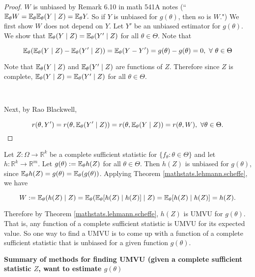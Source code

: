 \begin{proof} \(W\) is unbiased by Remark 6.10 in math 541A notes (``\(\E_\theta W = \E_\theta \E_\theta(Y \mid Z) = \E_\theta Y.\) So if \(Y\) is unbiased for \(g(\theta)\), then so is \(W\).") We first show \(W\) does not depend on \(Y\). Let \(Y'\) be an unbiased estimator for \(g(\theta)\). We show that \(\E_\theta(Y \mid Z) = \E_\theta(Y' \mid Z) \) for all \(\theta \in \Theta\). Note that

\[
\E_\theta( \E_\theta(Y \mid Z) - \E_\theta(Y' \mid Z)) = \E_\theta(Y - Y') = g(\theta) - g(\theta) = 0, \ \forall \ \theta \in \Theta
\]

Note that \( \E_\theta(Y \mid Z) \) and \(\E_\theta(Y' \mid Z)\) are functions of \(Z\). Therefore since \(Z\) is complete, \(\E_\theta(Y \mid Z)  = \E_\theta(Y' \mid Z)\) for all \(\theta \in \Theta\).

\

Next, by Rao Blackwell,

\[
r(\theta, Y') = r(\theta, \E_\theta(Y' \mid Z)) =  r(\theta, \E_\theta(Y \mid Z)) = r(\theta, W), \ \forall \theta \in \Theta.
\]

\end{proof}

\begin{remark} Let \(Z: \Omega \to \mathbb{R}^k\) be a complete sufficient statistic for \(\{f_\theta: \theta \in \Theta\}\) and let \(h: \mathbb{R}^k \to \mathbb{R}^m\). Let \(g(\theta) := \E_\theta h(Z)\) for all \(\theta \in \Theta\). Then \(h(Z)\) is unbiased for \(g(\theta)\), since \(\E_\theta h(Z) = g(\theta) = \E_\theta (g(\theta)) \). Applying Theorem \ref{mathstats.lehmann.scheffe}, we have

\[
W := \E_\theta(h(Z) \mid Z) = \E_\theta ( \E_\theta[h(Z) \mid h(Z)] \mid Z ) =  \E_\theta[h(Z) \mid h(Z)] = h(Z).
\]

Therefore by Theorem \ref{mathstats.lehmann.scheffe}, \(h(Z)\) is UMVU for \(g(\theta)\). That is, any function of a complete sufficient statistic is UMVU for its expected value. So one way to find a UMVU is to come up with a function of a complete sufficient statistic that is unbiased for a given function \(g(\theta)\).

\end{remark}

\textbf{Summary of methods for finding UMVU (given a complete sufficient statistic \(Z\), want to estimate \(g(\theta)\)}


